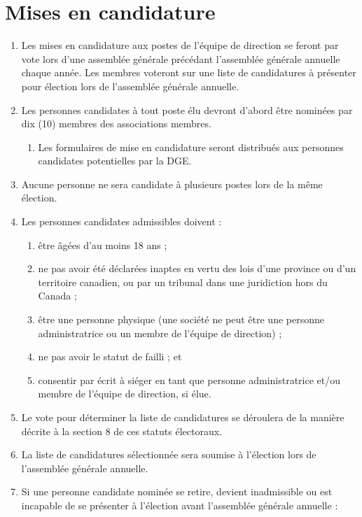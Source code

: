 \section{Mises en candidature}
\label{mises-en-candidature}

\begin{enumerate}
 \item Les mises en candidature aux postes de l'équipe de direction se feront par vote lors d'une assemblée générale précédant l'assemblée générale annuelle chaque année. Les membres voteront sur une liste de candidatures à présenter pour élection lors de l'assemblée générale annuelle.
 \item Les personnes candidates à tout poste élu devront d'abord être nominées par dix (10) membres des associations membres.
  \begin{enumerate}
   \item Les formulaires de mise en candidature seront distribués aux personnes candidates potentielles par la DGE.
  \end{enumerate}
 \item Aucune personne ne sera candidate à plusieurs postes lors de la même élection.
 \item Les personnes candidates admissibles doivent :
  \begin{enumerate}
   \item être âgées d'au moins 18 ans ;
   \item ne pas avoir été déclarées inaptes en vertu des lois d'une province ou d'un territoire canadien, ou par un tribunal dans une juridiction hors du Canada ;
   \item être une personne physique (une société ne peut être une personne administratrice ou un membre de l'équipe de direction) ;
   \item ne pas avoir le statut de failli ; et
   \item consentir par écrit à siéger en tant que personne administratrice et/ou membre de l'équipe de direction, si élue.
  \end{enumerate}
 \item Le vote pour déterminer la liste de candidatures se déroulera de la manière décrite à la section 8 de ces statuts électoraux.
 \item La liste de candidatures sélectionnée sera soumise à l'élection lors de l'assemblée générale annuelle.
 \item Si une personne candidate nominée se retire, devient inadmissible ou est incapable de se présenter à l'élection avant l'assemblée générale annuelle :

\end{enumerate}
